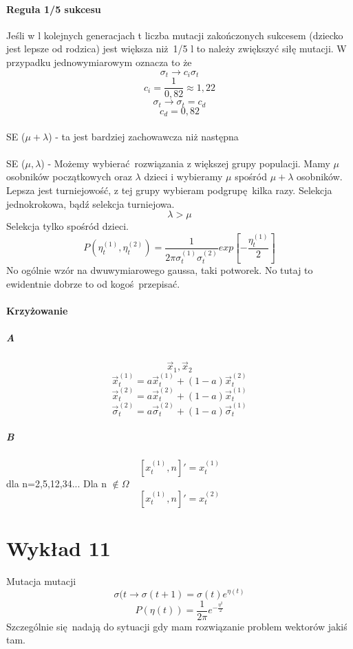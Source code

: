 \documentclass{article}
\begin{document}
		\paragraph{Reguła 1/5 sukcesu} Jeśli w l kolejnych generacjach t liczba mutacji zakończonych sukcesem (dziecko jest lepsze od rodzica) jest większa niż 1/5 l to należy zwiększyć siłę mutacji. W przypadku jednowymiarowym oznacza to że 
		$$\sigma_t \rightarrow c_i\sigma_t$$
		$$c_i = \frac{1}{0,82}\approx1,22$$
		$$\sigma_t \rightarrow \sigma_t = c_d$$
		$$c_d = 0,82$$
		
		\paragraph{}SE ($\mu + \lambda$) - ta jest bardziej zachowawcza niż następna 
		\paragraph{}SE ($\mu, \lambda$) - Możemy wybierać rozwiązania z większej grupy populacji. Mamy $\mu$ osobników początkowych oraz $\lambda$ dzieci i wybieramy $\mu$ spośród $\mu + \lambda$ osobników. Lepsza jest turniejowość, z tej grupy wybieram podgrupę kilka razy. Selekcja jednokrokowa, bądź selekcja turniejowa.
		$$\lambda > \mu$$
		Selekcja tylko spośród dzieci.
		$$P(\eta_t^{(1)}, \eta_t^{(2)}) = 
		\frac{1}{2\pi \sigma_t^{(1)}\sigma_t^{(2)}}
		exp[ - \frac{\eta_t^{(1)}}{2}]$$
		No ogólnie wzór na dwuwymiarowego gaussa, taki potworek.
		No tutaj to ewidentnie dobrze to od kogoś przepisać.
		\paragraph{Krzyżowanie}
		
		\subparagraph{A}
		$$\vec{x}_1, \vec{x}_2$$
		$$\vec{x}_t^{(1)} = a\vec{x}_t^{(1)} + (1-a)\vec{x}_t^{(2)}$$
		$$\vec{x}_t^{(2)} = a\vec{x}_t^{(2)} + (1-a)\vec{x}_t^{(1)}$$
		$$\vec{\sigma}_t^{(2)} = a\vec{\sigma}_t^{(2)} + (1-a)\vec{\sigma}_t^{(1)}$$
		
		\subparagraph{B} 
		$$[x_t^{(1)}, n]' = x^{(1)}_t$$	dla n=2,5,12,34...
		Dla n $\notin \Omega$
		$$[x_t^{(1)}, n]' = x^{(2)}_t$$
		
		\section{Wykład 11}
		Mutacja mutacji $$\sigma(t \rightarrow \sigma(t+1)=\sigma(t)e^{\eta(t)}$$
		$$P(\eta(t))=\frac{1}{2\pi}e^{-\frac{\eta^2}{2}}$$ 
		Szczególnie się nadają do sytuacji gdy mam rozwiązanie problem wektorów jakiś tam. 
\end{document}
